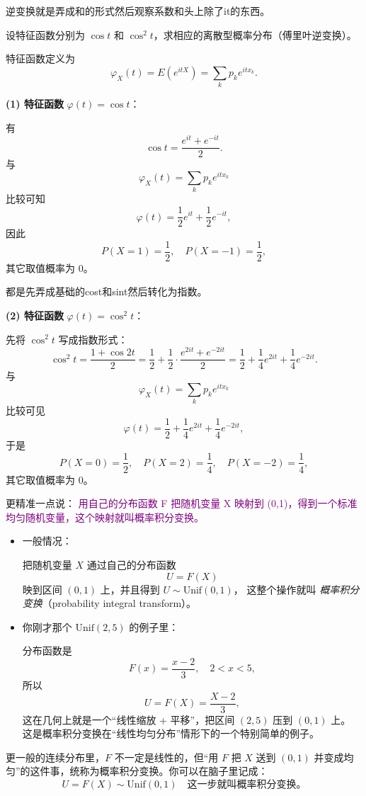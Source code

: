 \begin{dxtips}
    逆变换就是弄成和的形式然后观察系数和头上除了it的东西。
\end{dxtips}
\begin{homework}[4.6]
设特征函数分别为 $\cos t$ 和 $\cos^{2} t$，求相应的离散型概率分布（傅里叶逆变换）。
\end{homework}
\begin{solution}
特征函数定义为
\[
\varphi_X(t)=E(e^{itX})
=\sum_k p_k e^{itx_k}.
\]

\textbf{(1) 特征函数 } $\varphi(t)=\cos t$：

有
\[
\cos t = \frac{e^{it}+e^{-it}}{2}.
\]
与
\[
\varphi_X(t)=\sum_k p_k e^{itx_k}
\]
比较可知
\[
\varphi(t)=\frac{1}{2}e^{it}+\frac{1}{2}e^{-it},
\]
因此
\[
P(X=1)=\frac{1}{2},\quad P(X=-1)=\frac{1}{2},
\]
其它取值概率为 $0$。

\medskip
\begin{dxtips}
    都是先弄成基础的cost和sint然后转化为指数。
\end{dxtips}
\textbf{(2) 特征函数 } $\varphi(t)=\cos^2 t$：

先将 $\cos^2 t$ 写成指数形式：
\[
\cos^2 t = \frac{1+\cos 2t}{2}
= \frac{1}{2}+\frac{1}{2}\cdot\frac{e^{2it}+e^{-2it}}{2}
= \frac{1}{2}+\frac{1}{4}e^{2it}+\frac{1}{4}e^{-2it}.
\]
与
\[
\varphi_X(t)=\sum_k p_k e^{itx_k}
\]
比较可见
\[
\varphi(t)=\frac{1}{2}
+ \frac{1}{4}e^{2it}
+ \frac{1}{4}e^{-2it},
\]
于是
\[
P(X=0)=\frac{1}{2},\quad
P(X=2)=\frac{1}{4},\quad
P(X=-2)=\frac{1}{4},
\]
其它取值概率为 $0$。

\end{solution}
\begin{definition}[概率积分变换]
    更精准一点说：
\textcolor{purple}{用自己的分布函数 F 把随机变量 X 映射到 (0,1)，得到一个标准均匀随机变量，这个映射就叫概率积分变换。}
\begin{itemize}
  \item 一般情况：

  把随机变量 $X$ 通过自己的分布函数
  \[
    U = F(X)
  \]
  映到区间 $(0,1)$ 上，并且得到 $U\sim\mathrm{Unif}(0,1)$，
  这整个操作就叫 \emph{概率积分变换}（probability integral transform）。

  \item 你刚才那个 $\mathrm{Unif}(2,5)$ 的例子里：

  分布函数是
  \[
    F(x)=\frac{x-2}{3},\quad 2<x<5,
  \]
  所以
  \[
    U = F(X)=\frac{X-2}{3},
  \]
  这在几何上就是一个“线性缩放 + 平移”，把区间 $(2,5)$ 压到 $(0,1)$ 上。
  这是概率积分变换在“线性均匀分布”情形下的一个特别简单的例子。
\end{itemize}

更一般的连续分布里，$F$ 不一定是线性的，但“用 $F$ 把 $X$ 送到 $(0,1)$ 并变成均匀”的这件事，统称为概率积分变换。你可以在脑子里记成：
\[
  U = F(X)\sim \mathrm{Unif}(0,1)
  \quad\text{这一步就叫概率积分变换。}
\]
\end{definition}
